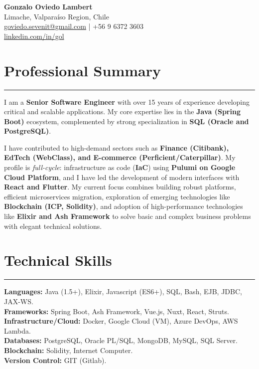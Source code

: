 \documentclass[11pt,a4paper]{article}
\newcommand{\hrefmailto}[2]{\href{#1 mailto:#2}{#2}}
\begin{document}
\begin{center}
    {\LARGE \textbf{Gonzalo Oviedo Lambert}} \\
    \vspace{2pt}
    Limache, Valparaíso Region, Chile \\
    \vspace{2pt}
    \hrefmailto{goviedo.sevenit@gmail.com}{goviedo.sevenit@gmail.com} | +56 9 6372 3603 \\
    \href{https://www.linkedin.com/in/gol}{linkedin.com/in/gol}
\end{center}

\section*{Professional Summary}
\hrule
\vspace{5pt}
\noindent
I am a \textbf{Senior Software Engineer} with over 15 years of experience developing critical and scalable applications. My core expertise lies in the \textbf{Java (Spring Boot)} ecosystem, complemented by strong specialization in \textbf{SQL (Oracle and PostgreSQL)}.

I have contributed to high-demand sectors such as \textbf{Finance (Citibank), EdTech (WebClass), and E-commerce (Perficient/Caterpillar)}. My profile is \textit{full-cycle}: infrastructure as code (\textbf{IaC}) using \textbf{Pulumi on Google Cloud Platform}, and I have led the development of modern interfaces with \textbf{React and Flutter}. My current focus combines building robust platforms, efficient microservices migration, exploration of emerging technologies like \textbf{Blockchain (ICP, Solidity)}, and adoption of high-performance technologies like \textbf{Elixir and Ash Framework} to solve basic and complex business problems with elegant technical solutions.

\section*{Technical Skills}
\hrule
\vspace{5pt}
\textbf{Languages:} Java (1.5+), Elixir, Javascript (ES6+), SQL, Bash, EJB, JDBC, JAX-WS. \\
\textbf{Frameworks:} Spring Boot, Ash Framework, Vue.js, Nuxt, React, Struts. \\
\textbf{Infrastructure/Cloud:} Docker, Google Cloud (VM), Azure DevOps, AWS Lambda. \\
\textbf{Databases:} PostgreSQL, Oracle PL/SQL, MongoDB, MySQL, SQL Server. \\
\textbf{Blockchain:} Solidity, Internet Computer. \\
\textbf{Version Control:} GIT (Gitlab).
\end{document}
